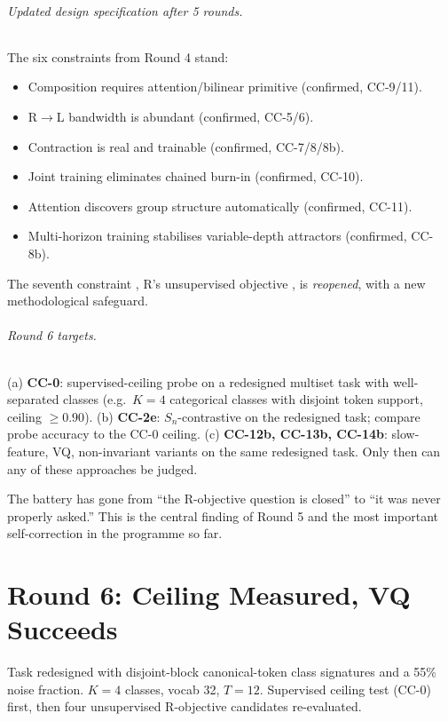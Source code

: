 \documentclass[10pt, twocolumn, a4paper]{article}
\newcommand{\Sn}{S_n}
\begin{document}
\paragraph{Updated design specification after 5 rounds.} The six constraints from Round 4 stand:
\begin{itemize}[nosep]
\item Composition requires attention/bilinear primitive (confirmed, CC-9/11).
\item R$\to$L bandwidth is abundant (confirmed, CC-5/6).
\item Contraction is real and trainable (confirmed, CC-7/8/8b).
\item Joint training eliminates chained burn-in (confirmed, CC-10).
\item Attention discovers group structure automatically (confirmed, CC-11).
\item Multi-horizon training stabilises variable-depth attractors (confirmed, CC-8b).
\end{itemize}
The seventh constraint ,  R's unsupervised objective ,  is \emph{reopened}, with a new methodological safeguard.

\paragraph{Round 6 targets.}
(a) \textbf{CC-0}: supervised-ceiling probe on a redesigned multiset task with well-separated classes (e.g.\ $K=4$ categorical classes with disjoint token support, ceiling $\ge 0.90$).
(b) \textbf{CC-2e}: $\Sn$-contrastive on the redesigned task; compare probe accuracy to the CC-0 ceiling.
(c) \textbf{CC-12b, CC-13b, CC-14b}: slow-feature, VQ, non-invariant variants on the same redesigned task. Only then can any of these approaches be judged.

The battery has gone from ``the R-objective question is closed'' to ``it was never properly asked.'' This is the central finding of Round 5 and the most important self-correction in the programme so far.


\part*{Round 6: Ceiling Measured, VQ Succeeds}

Task redesigned with disjoint-block canonical-token class signatures and a 55\% noise fraction. $K=4$ classes, vocab 32, $T=12$. Supervised ceiling test (CC-0) first, then four unsupervised R-objective candidates re-evaluated.
\end{document}
